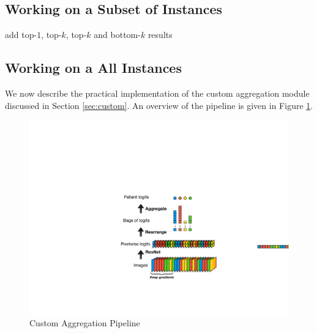 \documentclass[final]{cvpr}
\begin{document}
	\subsection{Working on a Subset of Instances}
	
	add top-$1$, top-$k$, top-$k$ and bottom-$k$ results
	
	\newpage
	
	\subsection{Working on a All Instances}
	
	We now describe the practical implementation of the custom aggregation module discussed in Section \ref{sec:custom}. An overview of the pipeline is given in Figure \ref{fig:overview}.
	
	\vspace{2mm}
	
	\begin{figure}[h!]
		\begin{center}
			\includegraphics[width=0.9\linewidth]{fig/graphic3.pdf}
		\end{center}
		\caption{Custom Aggregation Pipeline}
		\label{fig:overview}
	\end{figure}
	
\end{document}

